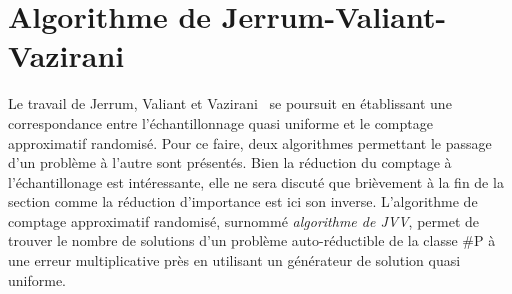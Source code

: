 
\section{Algorithme de Jerrum-Valiant-Vazirani}
\label{sec:algorithme-jvv}

Le travail de Jerrum, Valiant et Vazirani~\cite{jerrumRandomGenerationCombinatorial1986} se poursuit en établissant une correspondance entre l'échantillonnage quasi uniforme et le comptage approximatif randomisé. Pour ce faire, deux algorithmes permettant le passage d'un problème à l'autre sont présentés. Bien la réduction du comptage à l'échantillonage est intéressante, elle ne sera discuté que brièvement à la fin de la section comme la réduction d'importance est ici son inverse. L'algorithme de comptage approximatif randomisé, surnommé \textit{algorithme de JVV}, permet de trouver le nombre de solutions d'un problème auto-réductible de la classe \textsf{\#P} à une erreur multiplicative près en utilisant un générateur de solution quasi uniforme. 

